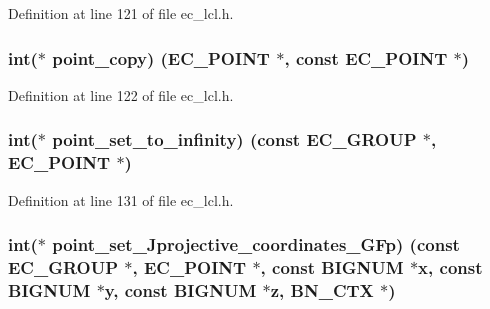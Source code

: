 Definition at line 121 of file ec\+\_\+lcl.\+h.

\subsubsection[{\texorpdfstring{point\+\_\+copy}{point_copy}}]{\setlength{\rightskip}{0pt plus 5cm}int($\ast$ point\+\_\+copy) ({\bf E\+C\+\_\+\+P\+O\+I\+NT} $\ast$, const {\bf E\+C\+\_\+\+P\+O\+I\+NT} $\ast$)}\hypertarget{structec__method__st_a76d2d81486721b8f493df8453ea97d12}{}\label{structec__method__st_a76d2d81486721b8f493df8453ea97d12}


Definition at line 122 of file ec\+\_\+lcl.\+h.

\subsubsection[{\texorpdfstring{point\+\_\+set\+\_\+to\+\_\+infinity}{point_set_to_infinity}}]{\setlength{\rightskip}{0pt plus 5cm}int($\ast$ point\+\_\+set\+\_\+to\+\_\+infinity) (const {\bf E\+C\+\_\+\+G\+R\+O\+UP} $\ast$, {\bf E\+C\+\_\+\+P\+O\+I\+NT} $\ast$)}\hypertarget{structec__method__st_a984109a1b2829f7d3ea93198d1541793}{}\label{structec__method__st_a984109a1b2829f7d3ea93198d1541793}


Definition at line 131 of file ec\+\_\+lcl.\+h.

\subsubsection[{\texorpdfstring{point\+\_\+set\+\_\+\+Jprojective\+\_\+coordinates\+\_\+\+G\+Fp}{point_set_Jprojective_coordinates_GFp}}]{\setlength{\rightskip}{0pt plus 5cm}int($\ast$ point\+\_\+set\+\_\+\+Jprojective\+\_\+coordinates\+\_\+\+G\+Fp) (const {\bf E\+C\+\_\+\+G\+R\+O\+UP} $\ast$, {\bf E\+C\+\_\+\+P\+O\+I\+NT} $\ast$, const {\bf B\+I\+G\+N\+UM} $\ast${\bf x}, const {\bf B\+I\+G\+N\+UM} $\ast$y, const {\bf B\+I\+G\+N\+UM} $\ast$z, {\bf B\+N\+\_\+\+C\+TX} $\ast$)}\hypertarget{structec__method__st_a4cb2d40c0fcc2d5c77eea7fba44167be}{}\label{structec__method__st_a4cb2d40c0fcc2d5c77eea7fba44167be}


